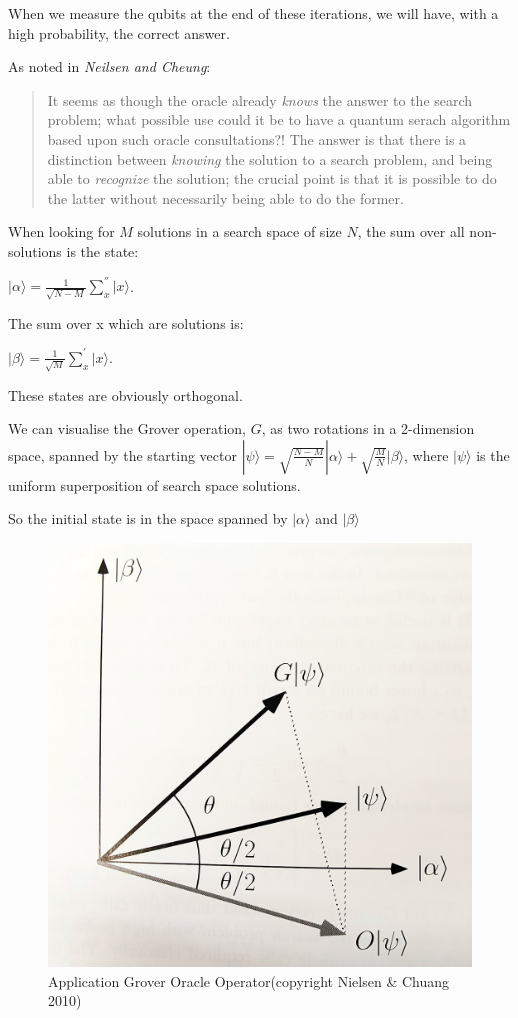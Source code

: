 When we measure the qubits at the end of these iterations, we will have,
with a high probability, the correct answer.

    As noted in \emph{Neilsen and Cheung}:

\begin{quote}
It seems as though the oracle already \emph{knows} the answer to the
search problem; what possible use could it be to have a quantum serach
algorithm based upon such oracle consultations?! The answer is that
there is a distinction between \emph{knowing} the solution to a search
problem, and being able to \emph{recognize} the solution; the crucial
point is that it is possible to do the latter without necessarily being
able to do the former.
\end{quote}

When looking for \(M\) solutions in a search space of size \(N\), the
sum over all non-solutions is the state:

\(|\alpha \rangle = \frac{1}{\sqrt{N-M}} \sum^{''}_{x}{|x\rangle}\).

The sum over x which are solutions is:

\(|\beta \rangle = \frac{1}{\sqrt{M}} \sum^{'}_{x}{|x\rangle}\).

These states are obviously orthogonal.

We can visualise the Grover operation, \(G\), as two rotations in a
2-dimension space, spanned by the starting vector
\(|\psi \rangle = \sqrt{\frac{N-M}{N}}|\alpha\rangle + \sqrt{\frac{M}{N}}|\beta\rangle\),
where \(|\psi\rangle\) is the uniform superposition of search space
solutions.

So the initial state is in the space spanned by \(|\alpha\rangle\) and
\(|\beta\rangle\)

\begin{figure}
	\centering
	\includegraphics{figures/single_grover_iteration.jpg}
	\caption{Application Grover Oracle Operator(copyright Nielsen \& Chuang 2010)}
\end{figure}

